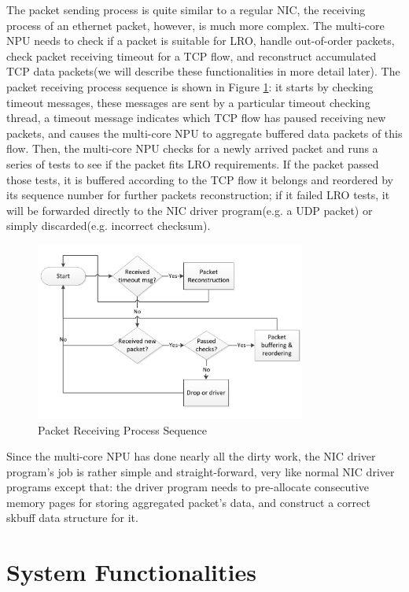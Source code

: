 \documentclass[conference]{IEEEtran}
\begin{document}
The packet sending process is quite similar to a regular NIC, the receiving process of an ethernet packet, however, is much more complex. The multi-core NPU needs to check if a packet is suitable for LRO, handle out-of-order packets, check packet receiving timeout for a TCP flow, and reconstruct accumulated TCP data packets(we will describe these functionalities in more detail later). The packet receiving process sequence is shown in Figure \ref{packet receiving process sequence}: it starts by checking timeout messages, these messages are sent by a particular timeout checking thread, a timeout message indicates which TCP flow has paused receiving new packets, and causes the multi-core NPU to aggregate buffered data packets of this flow. Then, the multi-core NPU checks for a newly arrived packet and runs a series of tests to see if the packet fits LRO requirements. If the packet passed those tests, it is buffered according to the TCP flow it belongs and reordered by its sequence number for further packets reconstruction; if it failed LRO tests, it will be forwarded directly to the NIC driver program(e.g. a UDP packet) or simply discarded(e.g. incorrect checksum).
\begin{figure}[!t]
\centering
\includegraphics[width=3.5in]{packet_receiving_process_sequence}
\caption{Packet Receiving Process Sequence}
\label{packet receiving process sequence}
\end{figure}
Since the multi-core NPU has done nearly all the dirty work, the NIC driver program's job is rather simple and straight-forward, very like normal NIC driver programs except that: the driver program needs to pre-allocate consecutive memory pages for storing aggregated packet's data, and construct a correct skbuff data structure for it.
\section{System Functionalities}
\end{document}
